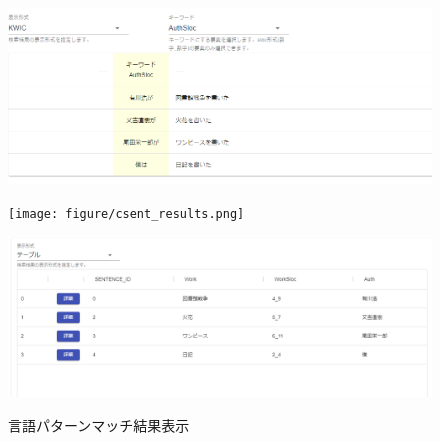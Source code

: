 \begin{description}
\begin{figure}[htbp]
 \begin{minipage}[b]{0.45\linewidth}
    \centering
    \includegraphics[keepaspectratio, scale=0.4]{figure/KWIC_results.png}
    \label{figure:KWIC}
  \end{minipage}
  \begin{minipage}[b]{0.45\linewidth}
    \centering
    \texttt{[image: figure/csent\_results.png]}
    \label{figure:acsent}
  \end{minipage}
  \begin{minipage}[b]{0.45\linewidth}
    \centering
    \includegraphics[keepaspectratio, scale=0.4]{figure/table_results.png}
    \label{figure:table}
  \end{minipage}
  \caption{言語パターンマッチ結果表示}\label{display_result}
\end{figure}
\end{description}




